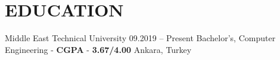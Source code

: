 \section{EDUCATION}

\resumeSubHeadingListStart
  
\resumeSubheading
  {Middle East Technical University}
  {09.2019 -- Present}
  {Bachelor's, Computer Engineering - \textbf{CGPA} - \textbf{3.67/4.00}}
  {Ankara, Turkey}
    \resumeItemListStart
    \resumeItemListEnd
\resumeSubHeadingListEnd
